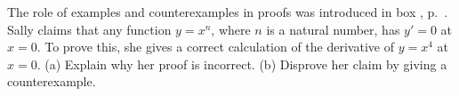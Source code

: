 The role of examples and counterexamples in proofs was introduced in
box , p.~\pageref{fig:proof-not-by-example}.
Sally claims that any function $y=x^n$, where $n$ is a natural number,
has $y'=0$ at $x=0$. To prove this, she gives a correct calculation
of the derivative of $y=x^4$ at $x=0$.
(a) Explain why her proof is incorrect.
(b) Disprove her claim by giving a counterexample.
